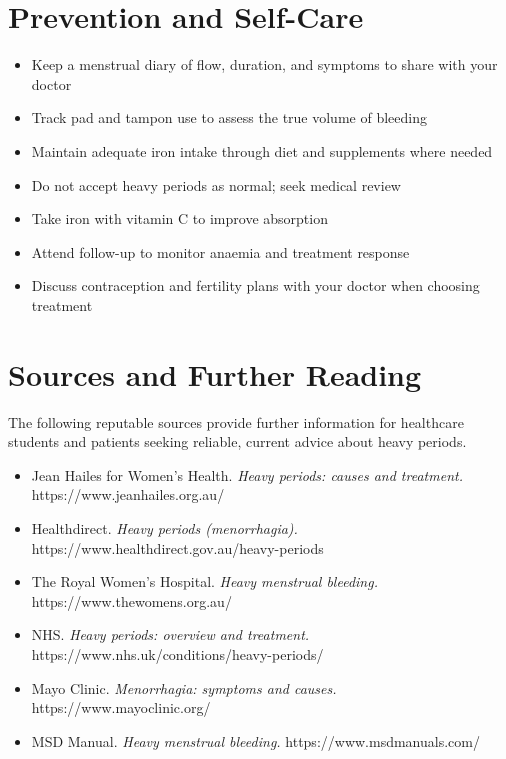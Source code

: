 \section*{Prevention and Self-Care}
\begin{itemize}
    \item Keep a menstrual diary of flow, duration, and symptoms to share with your doctor
    \item Track pad and tampon use to assess the true volume of bleeding
    \item Maintain adequate iron intake through diet and supplements where needed
    \item Do not accept heavy periods as normal; seek medical review
    \item Take iron with vitamin C to improve absorption
    \item Attend follow-up to monitor anaemia and treatment response
    \item Discuss contraception and fertility plans with your doctor when choosing treatment
\end{itemize}

\section*{Sources and Further Reading}
The following reputable sources provide further information for healthcare students and patients seeking reliable, current advice about heavy periods.

\begin{itemize}
    \item Jean Hailes for Women's Health. \textit{Heavy periods: causes and treatment.} https://www.jeanhailes.org.au/
    \item Healthdirect. \textit{Heavy periods (menorrhagia).} https://www.healthdirect.gov.au/heavy-periods
    \item The Royal Women's Hospital. \textit{Heavy menstrual bleeding.} https://www.thewomens.org.au/
    \item NHS. \textit{Heavy periods: overview and treatment.} https://www.nhs.uk/conditions/heavy-periods/
    \item Mayo Clinic. \textit{Menorrhagia: symptoms and causes.} https://www.mayoclinic.org/
    \item MSD Manual. \textit{Heavy menstrual bleeding.} https://www.msdmanuals.com/
\end{itemize}
